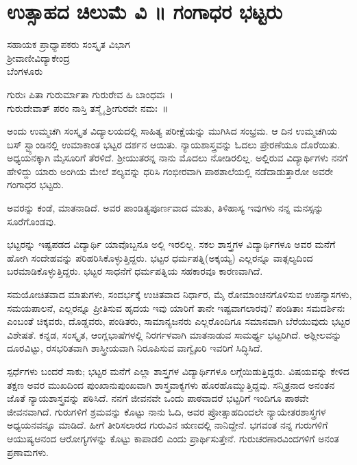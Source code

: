 {\fontsize{14}{16}\selectfont
\chapter{ಉತ್ಸಾಹದ ಚಿಲುಮೆ ವಿ ॥ ಗಂಗಾಧರ ಭಟ್ಟರು}

\begin{center}
\smallskip
ಸಹಾಯಕ ಪ್ರಾಧ್ಯಾಪಕರು \enginline{-} ಸಂಸ್ಕೃತ ವಿಭಾಗ \\
ಶ್ರೀವಾಣೀವಿದ್ಯಾಕೇಂದ್ರ\\
ಬೆಂಗಳೂರು
\addrule
\end{center}
\begin{center}
ಗುರುಃ ಪಿತಾ ಗುರುರ್ಮಾತಾ ಗುರುರೇವ ಹಿ ಬಾಂಧವಃ~।\\
ಗುರುದೇವಾತ್ ಪರಂ ನಾಸ್ತಿ ತಸ್ಮೈ ಶ್ರೀಗುರವೇ ನಮಃ~॥
\end{center}
ಅಂದು ಉಮ್ಮಚಗಿ ಸಂಸ್ಕೃತ ವಿದ್ಯಾಲಯದಲ್ಲಿ ಸಾಹಿತ್ಯ ಪರೀಕ್ಷೆಯನ್ನು ಮುಗಿಸಿದ ಸಂಭ್ರಮ. ಆ ದಿನ ಉಮ್ಮಚಗಿಯ ಬಸ್ ಸ್ಟ್ಯಾಂಡಿನಲ್ಲಿ ಉಮಾಕಾಂತ ಭಟ್ಟರ ದರ್ಶನ ಆಯಿತು. ನ್ಯಾಯಶಾಸ್ತ್ರವನ್ನು ಓದಲು ಪ್ರೇರಣೆಯೂ ದೊರೆಯಿತು. ಅಧ್ಯಯನಕ್ಕಾಗಿ ಮೈಸೂರಿಗೆ ತೆರಳಿದೆ. ಶ್ರೀಯುತರನ್ನ ನಾನು ಮೊದಲು ನೋಡಿರಲಿಲ್ಲ. ಅಲ್ಲಿರುವ ವಿದ್ಯಾರ್ಥಿಗಳು ನನಗೆ ಹೇಳಿದ್ದು  \enginline{-}   ಯಾರು ಅಂಗಿಯ ಮೇಲೆ ಶಲ್ಯವನ್ನು ಧರಿಸಿ ಗಂಭೀರ\-ವಾಗಿ ಪಾಠಶಾಲೆಯಲ್ಲಿ ನಡೆದಾಡುತ್ತಾರೋ ಅವರೇ ಗಂಗಾಧರ ಭಟ್ಟರು.

ಅವರನ್ನು ಕಂಡೆ, ಮಾತನಾಡಿದೆ. ಅವರ ಪಾಂಡಿತ್ಯಪೂರ್ಣವಾದ ಮಾತು, ತಿಳಿಹಾಸ್ಯ ಇವುಗಳು ನನ್ನ ಮನಸ್ಸನ್ನು ಸೂರೆಗೊಂಡವು.

ಭಟ್ಟರನ್ನು ಇಷ್ಟಪಡದ ವಿದ್ಯಾರ್ಥಿ ಯಾವೊಬ್ಬನೂ ಅಲ್ಲಿ ಇರಲಿಲ್ಲ. ಸಕಲ ಶಾಸ್ತ್ರಗಳ ವಿದ್ಯಾರ್ಥಿಗಳೂ ಅವರ ಮನೆಗೆ ಹೋಗಿ ಸಂದೇಹವನ್ನು ಪರಿಹರಿಸಿಕೊಳ್ಳುತ್ತಿದ್ದರು. ಭಟ್ಟರ ಧರ್ಮಪತ್ನಿ(ಅಕ್ಕಯ್ಯ) ಎಲ್ಲರನ್ನೂ ವಾತ್ಸಲ್ಯದಿಂದ ಬರಮಾಡಿಕೊಳ್ಳುತ್ತಿದ್ದರು. ಭಟ್ಟರ ಸಾಧನೆಗೆ ಧರ್ಮಪತ್ನಿಯ ಸಹಕಾರವೂ ಕಾರಣವಾಗಿದೆ.

ಸಮಯೋಚಿತವಾದ ಮಾತುಗಳು, ಸಂದರ್ಭಕ್ಕೆ ಉಚಿತವಾದ ನಿರ್ಧಾರ, ಮೈ ರೋಮಾಂಚನಗೊಳಿಸುವ ಉಪನ್ಯಾಸಗಳು, ಸಮಯಪಾಲನೆ, ಎಲ್ಲರನ್ನೂ ಪ್ರೀತಿಸುವ ಹೃದಯ ಇವು ಯಾರಿಗೆ ತಾನೇ ಇಷ್ಟವಾಗಲಾರವು? ಪಂಡಿತಾಃ ಸಮದರ್ಶಿನಃ ಎಂಬಂತೆ ಚಿಕ್ಕವರು, ದೊಡ್ಡವರು, ಪಂಡಿತರು, ಸಾಮಾನ್ಯಜನರು ಎಲ್ಲರೊಂದಿಗೂ ಸಮಾನವಾಗಿ ಬೆರೆಯುವುದು ಭಟ್ಟರ ವಿಶೇಷತೆ. ಕನ್ನಡ, ಸಂಸ್ಕೃತ, ಆಂಗ್ಲಭಾಷೆಗಳಲ್ಲಿ ನಿರರ್ಗಳವಾಗಿ ಮಾತನಾಡುವ ಸಾಮರ್ಥ್ಯ ಭಟ್ಟರಿಗಿದೆ. ಅಶ್ಲೀಲವನ್ನು ದೂರವಿಟ್ಟು, ರಸಭರಿತವಾಗಿ ಶಾಸ್ತ್ರೀಯವಾಗಿ ನಿರೂಪಿಸುವ ವಾಗ್ವೈಖರಿ ಇವರಿಗೆ ಸಿದ್ಧಿಸಿದೆ.

ಸ್ಪರ್ಧೆಗಳು ಬಂದರೆ ಸಾಕು; ಭಟ್ಟರ ಮನೆಗೆ ಎಲ್ಲಾ ಶಾಸ್ತ್ರಗಳ ವಿದ್ಯಾರ್ಥಿಗಳೂ ಲಗ್ಗೆಯಿಡುತ್ತಿದ್ದರು. ವಿಷಯವನ್ನು ಕೇಳಿದ ತಕ್ಷಣ ಅವರ ಮುಖದಿಂದ ಪುಂಖಾನುಪುಂಖವಾಗಿ ಶಾಸ್ತ್ರವಾಕ್ಯಗಳು ಹೊರಹೊಮ್ಮುತ್ತಿದ್ದವು. ಸನ್ಮಿತ್ರನಾದ ಅನಂತನ ಜೊತೆ ನ್ಯಾಯಶಾಸ್ತ್ರವನ್ನು ಪಠಿಸಿದೆ. ನನಗೆ ಜೀವನವೇ ಒಂದು ಪಾಠವಾದರೆ ಭಟ್ಟರಿಗೆ ಇಂದಿಗೂ ಪಾಠವೇ ಜೀವನವಾಗಿದೆ. ಗುರುಗಳಿಗೆ ಶ್ರಮವನ್ನು ಕೊಟ್ಟು ನಾನು ಓದಿ, ಅವರ ಪ್ರೋತ್ಸಾಹದಿಂದಲೇ ನ್ಯಾಯೇತರಶಾಸ್ತ್ರಗಳ ಅಧ್ಯಯನವನ್ನೂ ಮಾಡಿದೆ. ಹೀಗೆ ತೀರಿಸಲಾರದ ಗುರುವಿನ ಋಣದಲ್ಲಿ ನಾನಿದ್ದೇನೆ. 
ಭಗವಂತ ನನ್ನ ಗುರುಗಳಿಗೆ ಆಯುಷ್ಯಆನಂದ ಆರೋಗ್ಯಗಳನ್ನು ಕೊಟ್ಟು ಕಾಪಾಡಲಿ ಎಂದು ಪ್ರಾರ್ಥಿಸುತ್ತೇನೆ. ಗುರುಚರಣಾರವಿಂದಗಳಿಗೆ ಅನಂತ ಪ್ರಣಾಮಗಳು.

\articleend	
}
